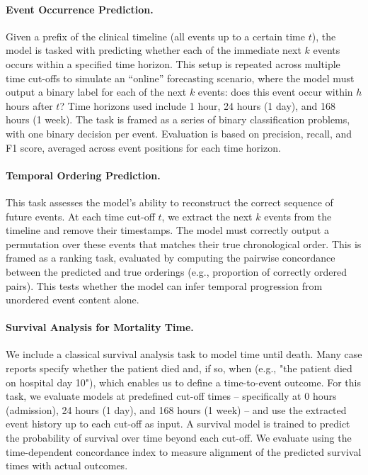 \paragraph{Event Occurrence Prediction.} 
Given a prefix of the clinical timeline (all events up to a certain time $t$), the model is tasked with predicting whether each of the immediate next $k$ events occurs within a specified time horizon. 
This setup is repeated across multiple time cut-offs to simulate an “online” forecasting scenario, where the model must output a binary label for each of the next $k$ events:
does this event occur within $h$ hours after $t$? 
Time horizons used include 1 hour, 24 hours (1 day), and 168 hours (1 week). 
The task is framed as a series of binary classification problems, with one binary decision per event. 
Evaluation is based on precision, recall, and F1 score, averaged across event positions for each time horizon.

\paragraph{Temporal Ordering Prediction.} 
This task assesses the model's ability to reconstruct the correct sequence of future events. 
At each time cut-off $t$, we extract the next $k$ events from the timeline and remove their timestamps. 
The model must correctly output a permutation over these events that matches their true chronological order. 
This is framed as a ranking task, evaluated by computing the pairwise concordance between the predicted and true orderings (e.g., proportion of correctly ordered pairs). 
This tests whether the model can infer temporal progression from unordered event content alone.

\paragraph{Survival Analysis for Mortality Time.}  
We include a classical survival analysis task to model time until death. 
Many case reports specify whether the patient died and, if so, when (e.g., "the patient died on hospital day 10"), which enables us to define a time-to-event outcome. 
For this task, we evaluate models at predefined cut-off times -- specifically at 0 hours (admission), 24 hours (1 day), and 168 hours (1 week) -- and use the extracted event history up to each cut-off as input. 
A survival model is trained to predict the probability of survival over time beyond each cut-off. 
We evaluate using the time-dependent concordance index to measure alignment of the predicted survival times with actual outcomes.

